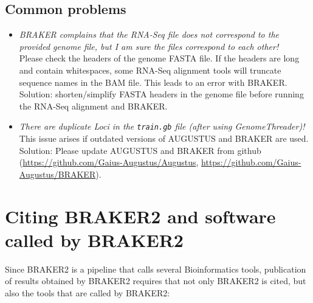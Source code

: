 \documentclass[]{article}
\begin{document}
\subsection{Common problems}\label{commonproblems}

\begin{itemize}
\item
  \emph{BRAKER complains that the RNA-Seq file does not correspond to
  the provided genome file, but I am sure the files correspond to each
  other!}\\
  Please check the headers of the genome FASTA file. If the headers are
  long and contain whitespaces, some RNA-Seq alignment tools will
  truncate sequence names in the BAM file. This leads to an error with
  BRAKER. Solution: shorten/simplify FASTA headers in the genome file
  before running the RNA-Seq alignment and BRAKER.
\item
  \emph{There are duplicate Loci in the \texttt{train.gb} file (after
  using GenomeThreader)!}\\
  This issue arises if outdated versions of AUGUSTUS and BRAKER are
  used. Solution: Please update AUGUSTUS and BRAKER from github
  (\url{https://github.com/Gaius-Augustus/Augustus},
  \url{https://github.com/Gaius-Augustus/BRAKER}).
\end{itemize}

\section{Citing BRAKER2 and software called by BRAKER2}\label{citing-braker2-and-software-called-by-braker2}

Since BRAKER2 is a pipeline that calls several Bioinformatics tools,
publication of results obtained by BRAKER2 requires that not only
BRAKER2 is cited, but also the tools that are called by BRAKER2:
\end{document}
